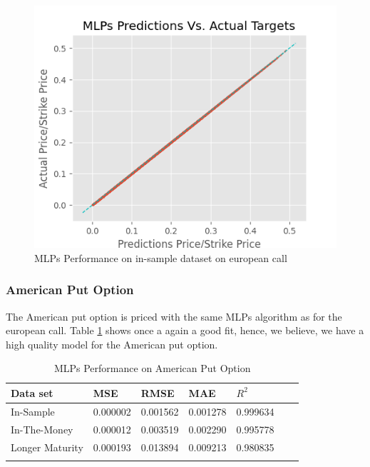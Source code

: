 \begin{figure}[th]
\centering
\includegraphics{Figures/PredictionEuroC.png}
\decoRule
\caption[MLPs Performance on in-sample dataset European Call]{MLPs Performance on in-sample dataset on european call}
\label{fig:MLPsInSampleEuroC}
\end{figure}


\subsubsection{American Put Option}
The American put option is priced with the same MLPs algorithm as for the european call. Table \ref{tab:AmerPerformanceComparision} shows once a again a good fit, hence, we believe, we have a high quality model for the American put option.

\begin{table}[th]
\caption{MLPs Performance on American Put Option}
\label{tab:AmerPerformanceComparision}
\centering
\begin{tabular}{l l l l l l l }
\toprule
\textbf{Data set} & \textbf{MSE} & \textbf{RMSE} & \textbf{MAE} & \textbf{$R^2$} \\
\midrule
In-Sample & 0.000002 & 0.001562 & 0.001278 & 0.999634\\
In-The-Money & 0.000012 & 0.003519 & 0.002290 & 0.995778\\
Longer Maturity & 0.000193 & 0.013894 & 0.009213 & 0.980835\\
\bottomrule\\
\end{tabular}
\end{table}

